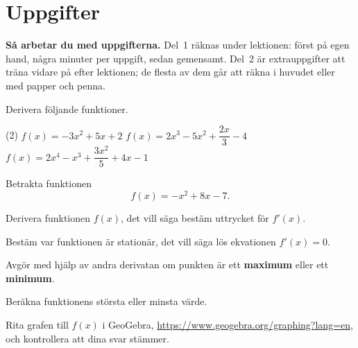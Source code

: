 
\section{Uppgifter}
\label{c12:sec:uppgifter}

\begin{aside}
\textbf{Så arbetar du med uppgifterna.} Del~1 räknas under lektionen: först på egen hand, några
minuter per uppgift, sedan gemensamt. Del~2 är extrauppgifter att träna vidare på efter
lektionen; de flesta av dem går att räkna i huvudet eller med papper och penna.

\end{aside}


Derivera följande funktioner.
\begin{delar}(2)
  \task $f(x) = -3x^2 + 5x + 2$
  \task $f(x) = 2x^3 - 5x^2 + \dfrac{2x}{3} - 4$
  \task* $f(x) = 2x^4 - x^3 + \dfrac{3x^2}{5} + 4x - 1$
\end{delar}

Betrakta funktionen
\[
  f(x) = -x^2 + 8x - 7.
\]
\begin{parts}
  \item Derivera funktionen $f(x)$, det vill säga bestäm uttrycket för $f'(x)$.
  \item Bestäm var funktionen är stationär, det vill säga lös ekvationen $f'(x) = 0$.
  \item Avgör med hjälp av andra derivatan om punkten är ett \textbf{maximum} eller ett
    \textbf{minimum}.
  \item Beräkna funktionens största eller minsta värde.
  \item Rita grafen till $f(x)$ i GeoGebra, \url{https://www.geogebra.org/graphing?lang=en}, och
    kontrollera att dina svar stämmer.
\end{parts}

